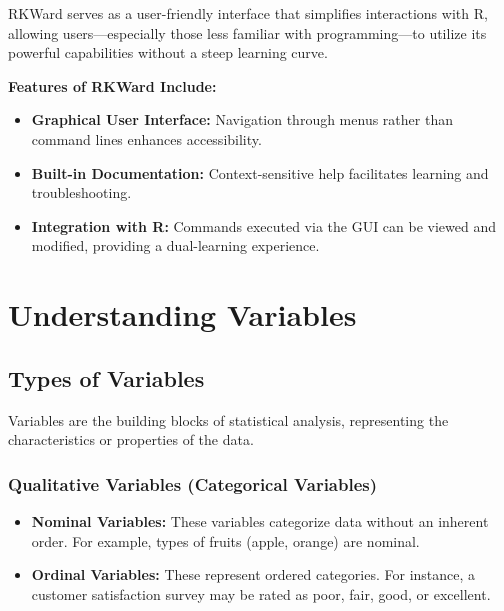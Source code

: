 \documentclass[
  letterpaper,
  DIV=11,
  numbers=noendperiod]{scrreprt}
\providecommand{\tightlist}{%
  \setlength{\itemsep}{0pt}\setlength{\parskip}{0pt}}
\begin{document}
RKWard serves as a user-friendly interface that simplifies interactions
with R, allowing users---especially those less familiar with
programming---to utilize its powerful capabilities without a steep
learning curve.

\textbf{Features of RKWard Include:}

\begin{itemize}
\tightlist
\item
  \textbf{Graphical User Interface:} Navigation through menus rather
  than command lines enhances accessibility.
\item
  \textbf{Built-in Documentation:} Context-sensitive help facilitates
  learning and troubleshooting.
\item
  \textbf{Integration with R:} Commands executed via the GUI can be
  viewed and modified, providing a dual-learning experience.
\end{itemize}


\chapter{Understanding Variables}\label{understanding-variables}

\section{Types of Variables}\label{types-of-variables}

Variables are the building blocks of statistical analysis, representing
the characteristics or properties of the data.

\subsection{Qualitative Variables (Categorical
Variables)}\label{qualitative-variables-categorical-variables}

\begin{itemize}
\tightlist
\item
  \textbf{Nominal Variables:} These variables categorize data without an
  inherent order. For example, types of fruits (apple, orange) are
  nominal.
\item
  \textbf{Ordinal Variables:} These represent ordered categories. For
  instance, a customer satisfaction survey may be rated as poor, fair,
  good, or excellent.
\end{itemize}
\end{document}
